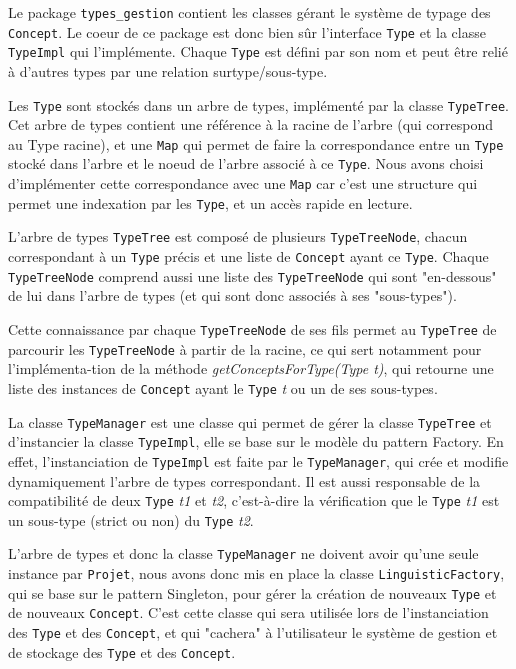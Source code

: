 \documentclass[12pt]{report}
\begin{document}
Le package \texttt{types\_gestion} contient les classes gérant le système de typage des \texttt{Concept}. Le coeur de ce package est donc bien sûr l'interface \texttt{Type} et la classe \texttt{TypeImpl} qui l'implémente.
Chaque \texttt{Type} est défini par son nom et peut être relié à d'autres types par une relation surtype/sous-type.

\bigskip

Les \texttt{Type} sont stockés dans un arbre de types, implémenté par la classe \texttt{TypeTree}. Cet arbre de types contient une référence à la racine de l'arbre (qui correspond au Type racine), et une \texttt{Map} qui permet de faire la correspondance entre un \texttt{Type} stocké dans l'arbre et le noeud de l'arbre associé à ce \texttt{Type}. Nous avons choisi d'implémenter cette correspondance avec une \texttt{Map} car c'est une structure qui permet une indexation par les \texttt{Type}, et un accès rapide en lecture.

L'arbre de types \texttt{TypeTree} est composé de plusieurs \texttt{TypeTreeNode}, chacun correspondant à un \texttt{Type} précis et une liste de \texttt{Concept} ayant ce \texttt{Type}. Chaque \texttt{TypeTreeNode} comprend aussi une liste des \texttt{TypeTreeNode} qui sont "en-dessous" de lui dans l'arbre de types (et qui sont donc associés à ses "sous-types").

Cette connaissance par chaque \texttt{TypeTreeNode} de ses fils permet au \texttt{TypeTree} de parcourir les \texttt{TypeTreeNode} à partir de la racine, ce qui sert notamment pour l'implémenta-tion de la méthode \emph{getConceptsForType(Type t)}, qui retourne une liste des instances de \texttt{Concept} ayant le \texttt{Type} \emph{t} ou un de ses sous-types.

\bigskip

La classe \texttt{TypeManager} est une classe qui permet de gérer la classe \texttt{TypeTree} et d'instancier la classe \texttt{TypeImpl}, elle se base sur le modèle du pattern Factory. En effet, l'instanciation de \texttt{TypeImpl} est faite par le \texttt{TypeManager}, qui crée et modifie dynamiquement l'arbre de types correspondant. Il est aussi responsable de la compatibilité de deux \texttt{Type} \emph{t1} et \emph{t2}, c'est-à-dire la vérification que le \texttt{Type} \emph{t1} est un sous-type (strict ou non) du \texttt{Type} \emph{t2}.

\bigskip

L'arbre de types et donc la classe \texttt{TypeManager} ne doivent avoir qu'une seule instance par \texttt{Projet}, nous avons donc mis en place la classe \texttt{LinguisticFactory}, qui se base sur le pattern Singleton, pour gérer la création de nouveaux \texttt{Type} et de nouveaux \texttt{Concept}. C'est cette classe qui sera utilisée lors de l'instanciation des \texttt{Type} et des \texttt{Concept}, et qui "cachera" à l'utilisateur le système de gestion et de stockage des \texttt{Type} et des \texttt{Concept}.
\end{document}
